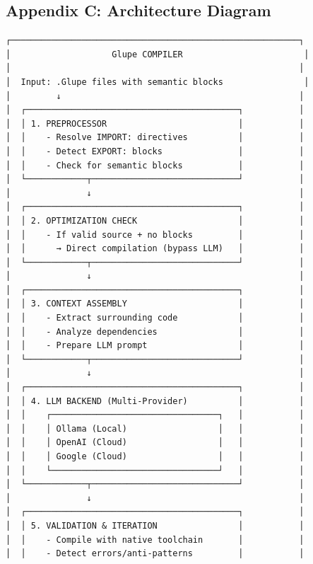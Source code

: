 \documentclass[11pt, a4paper]{article}
\begin{document}
\subsection{Appendix C: Architecture
Diagram}\label{appendix-c-architecture-diagram}

\begin{verbatim}
┌─────────────────────────────────────────────────────────┐
│                    Glupe COMPILER                        │
│                                                         │
│  Input: .Glupe files with semantic blocks                │
│         ↓                                               │
│  ┌──────────────────────────────────────────┐           │
│  │ 1. PREPROCESSOR                          │           │
│  │    - Resolve IMPORT: directives          │           │
│  │    - Detect EXPORT: blocks               │           │
│  │    - Check for semantic blocks           │           │
│  └────────────┬─────────────────────────────┘           │
│               ↓                                         │
│  ┌──────────────────────────────────────────┐           │
│  │ 2. OPTIMIZATION CHECK                    │           │
│  │    - If valid source + no blocks         │           │
│  │      → Direct compilation (bypass LLM)   │           │
│  └────────────┬─────────────────────────────┘           │
│               ↓                                         │
│  ┌──────────────────────────────────────────┐           │
│  │ 3. CONTEXT ASSEMBLY                      │           │
│  │    - Extract surrounding code            │           │
│  │    - Analyze dependencies                │           │
│  │    - Prepare LLM prompt                  │           │
│  └────────────┬─────────────────────────────┘           │
│               ↓                                         │
│  ┌──────────────────────────────────────────┐           │
│  │ 4. LLM BACKEND (Multi-Provider)          │           │
│  │    ┌─────────────────────────────────┐   │           │
│  │    │ Ollama (Local)                  │   │           │
│  │    │ OpenAI (Cloud)                  │   │           │
│  │    │ Google (Cloud)                  │   │           │
│  │    └─────────────────────────────────┘   │           │
│  └────────────┬─────────────────────────────┘           │
│               ↓                                         │
│  ┌──────────────────────────────────────────┐           │
│  │ 5. VALIDATION & ITERATION                │           │
│  │    - Compile with native toolchain       │           │
│  │    - Detect errors/anti-patterns         │           │

\end{verbatim}
\end{document}
